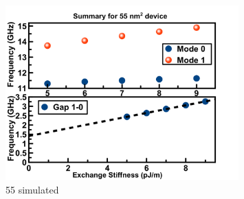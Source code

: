 \begin{figure}[!ht]
  \centering
  \includegraphics[width=0.8\textwidth]{fig/2018/sim/55sim}
   \caption{55 simulated}
  \label{fig:55sim}
\end{figure}



